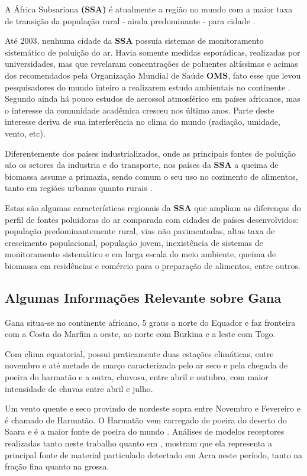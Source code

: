 A África Subsariana \textbf{(SSA)} é atualmente a região no mundo com a maior 
taxa de transição da população rural - ainda predominante - para cidade
\citep{MONTGOMERY2008}. 

Até 2003, nenhuma cidade da \textbf{SSA} possuía sistemas de monitoramento 
sistemático de poluição do ar. Havia somente medidas esporádicas, realizadas
por universidades, mas que revelaram concentrações de poluentes altíssimas e 
acimas dos recomendados pela Organização Mundial de Saúde \textbf{OMS},
fato esse que levou pesquisadores do mundo inteiro a 
realizarem estudo ambientais no continente \citep{EZZATI2004}. 
Segundo \cite{aboh2009} ainda há pouco estudos de aerossol atmosférico 
em países africanos, mas o interesse da comunidade acadêmica cresceu
nos último anos. Parte deste interesse deriva de sua interferência no clima  do mundo
(radiação, umidade, vento, etc).

Diferentemente dos países industrializados, onde as principais fontes de poluição 
são os setores da industria e do transporte, nos países da \textbf{SSA} a 
queima de biomassa assume a primazia, sendo comum o seu uso no cozimento 
de alimentos, tanto em regiões urbanas quanto rurais \citep{SMITH2004}. 

Estas são algumas características regionais da \textbf{SSA} que ampliam as 
diferenças do perfil de fontes poluidoras do ar comparada com cidades 
de países desenvolvidos: população predominantemente rural,
vias não pavimentadas, altas taxa de crescimento populacional, população jovem,
inexistência de sistemas de monitoramento sistemático e em larga escala do meio 
ambiente, queima de biomassa em residências e comércio para o preparação
de alimentos, entre outros. 

\subsection{Algumas Informações Relevante sobre Gana}

Gana situa-se no continente africano, 5 graus a norte do Equador e 
faz fronteira com a Costa do Marfim a oeste, ao norte com Burkina
e a leste com Togo. 

Com clima equatorial, possui praticamente duas estações climáticas, 
entre novembro e até metade de março caracterizada pelo ar seco e pela 
chegada de poeira do harmatão e a outra, chuvosa, entre abril e outubro, 
com maior intensidade de chuvas entre abril e julho. 

Um vento quente e seco provindo de nordeste sopra entre Novembro e Fevereiro 
e é chamado de Harmatão. O Harmatão vem carregado de poeira do 
deserto do Saara e é a maior fonte de poeira do mundo \citep{breuning2005}. 
Análises de modelos receptores realizadas tanto neste trabalho quanto em 
\cite{zhou2011}, mostram que ela representa a principal fonte de material 
particulado detectado em Acra neste período, tanto na fração fina quanto na grossa.

